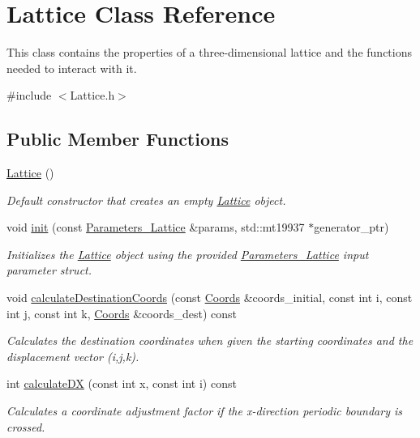 \hypertarget{class_lattice}{}\section{Lattice Class Reference}
\label{class_lattice}


This class contains the properties of a three-\/dimensional lattice and the functions needed to interact with it.  




{\ttfamily \#include $<$Lattice.\+h$>$}

\subsection*{Public Member Functions}
\begin{DoxyCompactItemize}
\item 
\hyperlink{class_lattice_a70a5cebc3c0c5a0f609be0592e7cc117}{Lattice} ()
\begin{DoxyCompactList}\small\item\em Default constructor that creates an empty \hyperlink{class_lattice}{Lattice} object. \end{DoxyCompactList}\item 
void \hyperlink{class_lattice_a2b0a88048fae662aa71386a3a123a260}{init} (const \hyperlink{struct_parameters___lattice}{Parameters\+\_\+\+Lattice} \&params, std\+::mt19937 $\ast$generator\+\_\+ptr)
\begin{DoxyCompactList}\small\item\em Initializes the \hyperlink{class_lattice}{Lattice} object using the provided \hyperlink{struct_parameters___lattice}{Parameters\+\_\+\+Lattice} input parameter struct. \end{DoxyCompactList}\item 
void \hyperlink{class_lattice_aa6b80d6264bfc23ae5fea39abd2557d5}{calculate\+Destination\+Coords} (const \hyperlink{struct_coords}{Coords} \&coords\+\_\+initial, const int i, const int j, const int k, \hyperlink{struct_coords}{Coords} \&coords\+\_\+dest) const
\begin{DoxyCompactList}\small\item\em Calculates the destination coordinates when given the starting coordinates and the displacement vector (i,j,k). \end{DoxyCompactList}\item 
int \hyperlink{class_lattice_a08adb2f412af409d3ec241e60e687c1a}{calculate\+DX} (const int x, const int i) const
\begin{DoxyCompactList}\small\item\em Calculates a coordinate adjustment factor if the x-\/direction periodic boundary is crossed. \end{DoxyCompactList}\item 

\end{DoxyCompactItemize}
